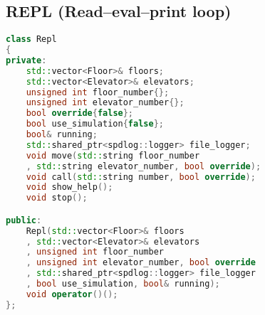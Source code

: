 \subsection{REPL (Read–eval–print loop)}

\begin{lstlisting}[language=C++]
class Repl
{
private:
    std::vector<Floor>& floors;
    std::vector<Elevator>& elevators;
    unsigned int floor_number{};
    unsigned int elevator_number{};
    bool override{false};
    bool use_simulation{false};
    bool& running;
    std::shared_ptr<spdlog::logger> file_logger;
    void move(std::string floor_number
    , std::string elevator_number, bool override);
    void call(std::string number, bool override);
    void show_help();
    void stop();

public:
    Repl(std::vector<Floor>& floors
    , std::vector<Elevator>& elevators
    , unsigned int floor_number
    , unsigned int elevator_number, bool override
    , std::shared_ptr<spdlog::logger> file_logger
    , bool use_simulation, bool& running);
    void operator()();
};
\end{lstlisting}

\vspace{5mm}

